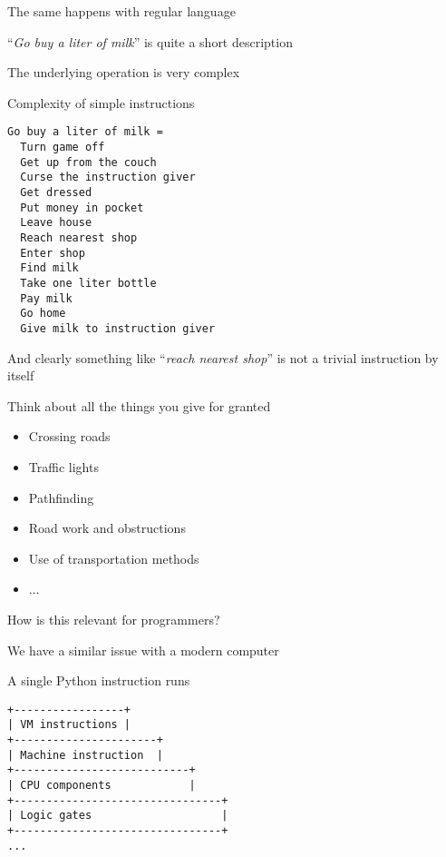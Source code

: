 \documentclass{beamer}
\begin{document}
\begin{slide}{
\item The same happens with regular language
\item ``\textit{Go buy a liter of milk}'' is quite a short description
\item The underlying operation is very complex
}\end{slide}

\begin{frame}[fragile]{Complexity of simple instructions}
\begin{lstlisting}
Go buy a liter of milk =
  Turn game off
  Get up from the couch
  Curse the instruction giver
  Get dressed
  Put money in pocket
  Leave house
  Reach nearest shop
  Enter shop
  Find milk
  Take one liter bottle
  Pay milk
  Go home
  Give milk to instruction giver
\end{lstlisting}
\end{frame}

\begin{slide}{
\item And clearly something like ``\textit{reach nearest shop}'' is not a trivial instruction by itself
\item Think about all the things you give for granted
\begin{itemize}
\item Crossing roads
\item Traffic lights
\item Pathfinding
\item Road work and obstructions
\item Use of transportation methods
\item ...
\end{itemize}
}\end{slide}

\begin{slide}{
\item How is this relevant for programmers?
\item We have a similar issue with a modern computer
}\end{slide}

\begin{frame}[fragile]{A single Python instruction runs}
\begin{lstlisting}
+-----------------+
| VM instructions |
+----------------------+
| Machine instruction  |
+---------------------------+
| CPU components            |
+--------------------------------+
| Logic gates                    |
+--------------------------------+
...
\end{lstlisting}
\end{frame}
\end{document}
